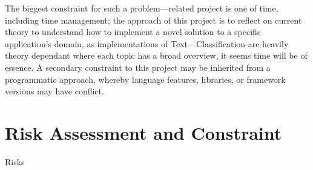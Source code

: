 The biggest constraint for such a problem---related project is one of time, including time management; the approach of this project is to reflect on current theory to understand how to implement a novel solution to a specific application’s domain, as implementations of Text---Classification are heavily theory dependant where each topic has a broad overview, it seems time will be of essence. A secondary constraint to this project may be inherited from a programmatic approach, whereby language features, libraries, or framework versions may have conflict.

\section{Risk Assessment and Constraint}

Risks

